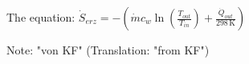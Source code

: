 The equation:  
\( \dot{S}_{erz} = - \left( \dot{m} c_{w} \ln \left( \frac{T_{out}}{T_{in}} \right) + \frac{\dot{Q}_{out}}{298 \, \text{K}} \right) \)  

Note:  
"von KF" (Translation: "from KF")